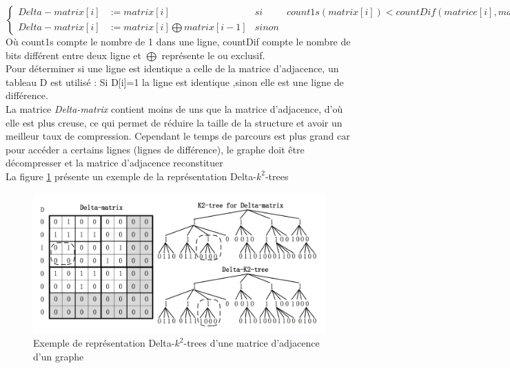 $\left\{
\begin{array}{llcl}
Delta-matrix[i] & := matrix[i] & si & count1s(matrix[i]) < countDif(matrice[i],matrix[i-1]) \\
Delta-matrix[i] & := matrix[i] \bigoplus matrix[i-1] &  sinon
\end{array}
\right.$\\

Où count1s compte le nombre de 1 dans une ligne, countDif compte le nombre de bits différent entre deux ligne et $\bigoplus$ représente le ou exclusif.\\
Pour déterminer si une ligne est identique a celle de la matrice d'adjacence, un tableau D est utilisé : Si D[i]=1 la ligne est identique ,sinon elle est une ligne de différence.\\
La matrice \textit{Delta-matrix} contient moins de uns que la matrice d'adjacence, d'où elle est plus creuse, ce qui permet de réduire la taille de la structure et avoir un meilleur taux de compression. Cependant le temps de parcours est plus grand car pour accéder a certains lignes (lignes de différence), le graphe doit être décompresser et la matrice d'adjacence reconstituer\\

La figure \ref{k2-trees-delta} présente un exemple de la représentation Delta-$k^2$-trees


\begin{figure}[H]
\begin{center}
\includegraphics[height=150 pt, width=380 pt]{./ressources/image/k2-trees-delta.png} 
\end{center}
\caption{Exemple de représentation Delta-$k^2$-trees d'une matrice d'adjacence d'un graphe}
\label{k2-trees-delta}
\end{figure}

